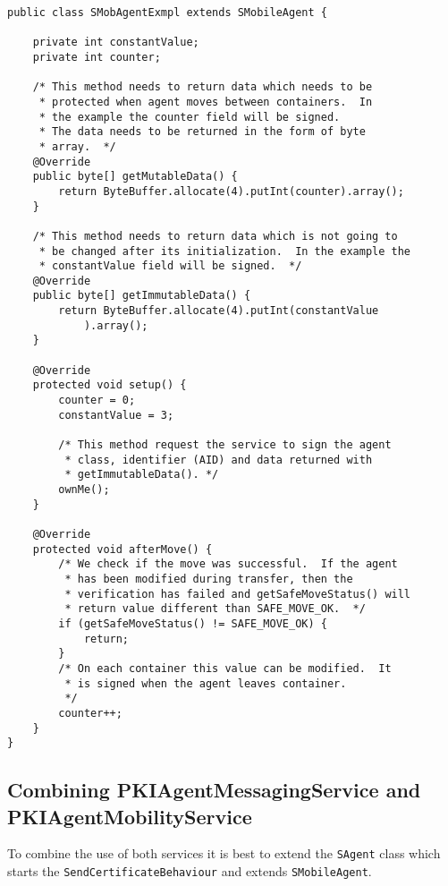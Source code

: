\documentclass[a4paper,11pt]{article}
\begin{document}
\begin{verbatim}
public class SMobAgentExmpl extends SMobileAgent {

    private int constantValue;
    private int counter;

    /* This method needs to return data which needs to be
     * protected when agent moves between containers.  In
     * the example the counter field will be signed.
     * The data needs to be returned in the form of byte
     * array.  */
    @Override
    public byte[] getMutableData() {
        return ByteBuffer.allocate(4).putInt(counter).array();
    }

    /* This method needs to return data which is not going to
     * be changed after its initialization.  In the example the
     * constantValue field will be signed.  */
    @Override
    public byte[] getImmutableData() {
        return ByteBuffer.allocate(4).putInt(constantValue
            ).array();
    }

    @Override
    protected void setup() {
        counter = 0;
        constantValue = 3;

        /* This method request the service to sign the agent
         * class, identifier (AID) and data returned with
         * getImmutableData(). */
        ownMe();
    }

    @Override
    protected void afterMove() {
        /* We check if the move was successful.  If the agent
         * has been modified during transfer, then the
         * verification has failed and getSafeMoveStatus() will
         * return value different than SAFE_MOVE_OK.  */
        if (getSafeMoveStatus() != SAFE_MOVE_OK) {
            return;
        }
        /* On each container this value can be modified.  It
         * is signed when the agent leaves container.
         */
        counter++;
    }
}
\end{verbatim}

\subsection{Combining PKI\-Agent\-Messaging\-Ser\-vice and
PKI\-Agent\-Mo\-bi\-li\-ty\-Ser\-vice}

To combine the use of both services it is best to extend the \texttt{SAgent}
class which starts the \texttt{Send\-Cer\-ti\-fi\-cate\-Be\-ha\-viour} and
extends \texttt{SMo\-bile\-Agent}.
\end{document}
